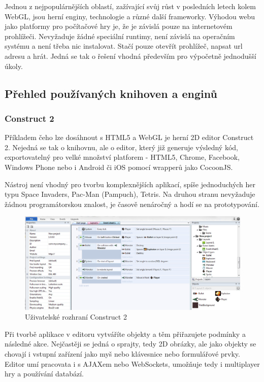 \documentclass[12pt,a4paper,titlepage,final]{report}
\begin{document}
Jednou z nejpopulárnějších oblastí, zažívající svůj růst v posledních letech kolem WebGL, jsou herní enginy, technologie a různé další frameworky. Výhodou webu jako platformy pro počítačové hry je, že je závislá pouze na internetovém prohlížeči. Nevyžaduje žádné speciální runtimy, není závislá na operačním systému a není třeba nic instalovat. Stačí pouze otevřít prohlížeč, napsat url adresu a hrát. Jedná se tak o řešení vhodná především pro výpočetně jednodušší úkoly.

\subsection{Přehled používaných knihoven a enginů}

\subsubsection{Construct 2}

Příkladem čeho lze dosáhnout s HTML5 a WebGL je herní 2D editor Construct 2. Nejedná se tak o knihovnu, ale o editor, který již generuje výsledný kód, exportovatelný pro velké množství platforem - HTML5, Chrome, Facebook, Windows Phone nebo i Android či iOS pomocí wrapperů jako CocoonJS.

Nástroj není vhodný pro tvorbu komplexnějších aplikací, spíše jednoduchých her typu Space Invaders, Pac-Man (Pampuch), Tetris. Na druhou stranu nevyžaduje žádnou programátorskou znalost,  je časově nenáročný a hodí se na prototypování.

\begin{figure}[ht]
\begin{center}
\includegraphics[width=14cm]{images/construct2.jpg}
\caption{Uživatelské rozhraní Construct 2}
\label{fig:theory}
\end{center}
\end{figure}

Při tvorbě aplikace v editoru vytváříte objekty a těm přiřazujete podmínky a následné akce. Nejčastěji se jedná o sprajty, tedy 2D obrázky, ale jako objekty se chovají i vstupní zařízení jako myš nebo klávesnice nebo formulářové prvky. Editor umí pracovata i s AJAXem nebo WebSockets, umožňuje tedy i multiplayer hry a používání databází.



\nocite{cite1}

\hypertarget{bib}{}

\end{document}

